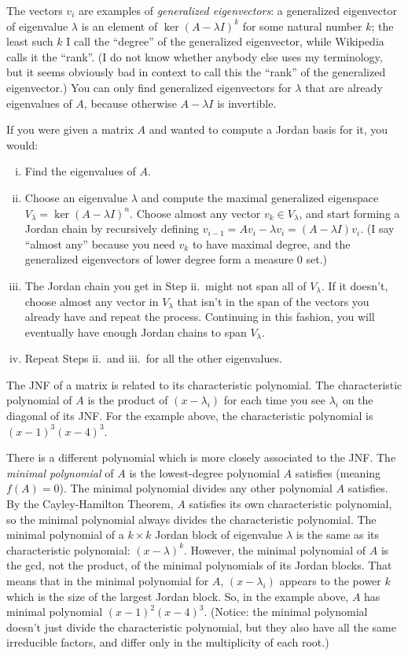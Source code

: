 The vectors $v_i$ are examples of \emph{generalized eigenvectors}: a generalized eigenvector of eigenvalue $\lambda$ is an element of $\ker (A-\lambda I)^k$ for some natural number $k$; the least such $k$ I call the ``degree'' of the generalized eigenvector, while Wikipedia calls it the ``rank''. (I do not know whether anybody else uses my terminology, but it seems obviously bad in context to call this the ``rank'' of the generalized eigenvector.) You can only find generalized eigenvectors for $\lambda$ that are already eigenvalues of $A$, because otherwise $A - \lambda I$ is invertible.

If you were given a matrix $A$ and wanted to compute a Jordan basis for it, you would:
\begin{enumerate}[i.]
    \item Find the eigenvalues of $A$.
    \item Choose an eigenvalue $\lambda$ and compute the maximal generalized eigenspace $V_{\lambda} = \ker (A-\lambda I)^n$. Choose almost any vector $v_k \in V_{\lambda}$, and start forming a Jordan chain by recursively defining $v_{i-1} = Av_i - \lambda v_i = (A-\lambda I)v_i$. (I say ``almost any'' because you need $v_k$ to have maximal degree, and the generalized eigenvectors of lower degree form a measure 0 set.)
    \item The Jordan chain you get in Step ii.\ might not span all of $V_{\lambda}$. If it doesn't, choose almost any vector in $V_{\lambda}$ that isn't in the span of the vectors you already have and repeat the process. Continuing in this fashion, you will eventually have enough Jordan chains to span $V_{\lambda}$.
    \item Repeat Steps ii.\ and iii.\ for all the other eigenvalues.
\end{enumerate}

The JNF of a matrix is related to its characteristic polynomial. The characteristic polynomial of $A$ is the product of $(x-\lambda_i)$ for each time you see $\lambda_i$ on the diagonal of its JNF. For the example above, the characteristic polynomial is $(x-1)^3(x-4)^3$.

There is a different polynomial which is more closely associated to the JNF. The \emph{minimal polynomial} of $A$ is the lowest-degree polynomial $A$ satisfies (meaning $f(A) = 0$). The minimal polynomial divides any other polynomial $A$ satisfies. By the Cayley-Hamilton Theorem, $A$ satisfies its own characteristic polynomial, so the minimal polynomial always divides the characteristic polynomial. The minimal polynomial of a $k \times k$ Jordan block of eigenvalue $\lambda$ is the same as its characteristic polynomial: $(x-\lambda)^k$. However, the minimal polynomial of $A$ is the gcd, not the product, of the minimal polynomials of its Jordan blocks. That means that in the minimal polynomial for $A$, $(x-\lambda_i)$ appears to the power $k$ which is the size of the largest Jordan block. So, in the example above, $A$ has minimal polynomial $(x-1)^2 (x-4)^3$. (Notice: the minimal polynomial doesn't just divide the characteristic polynomial, but they also have all the same irreducible factors, and differ only in the multiplicity of each root.)


